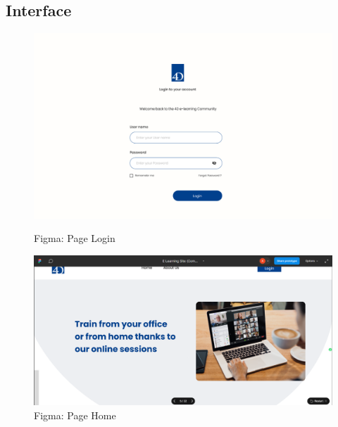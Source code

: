 \subsection{Interface}


\begin{figure}[H]
    \centering
    \begin{minipage}{0.45\textwidth}
        \centering
        \includegraphics[width=\textwidth]{Figures/login.PNG}
        \caption{Figma: Page Login}
    \end{minipage}
    \hfill
    \begin{minipage}{0.45\textwidth}
        \centering
        \includegraphics[width=\textwidth]{Figures/home.PNG}
        \caption{Figma: Page Home}
    \end{minipage}
\end{figure}

